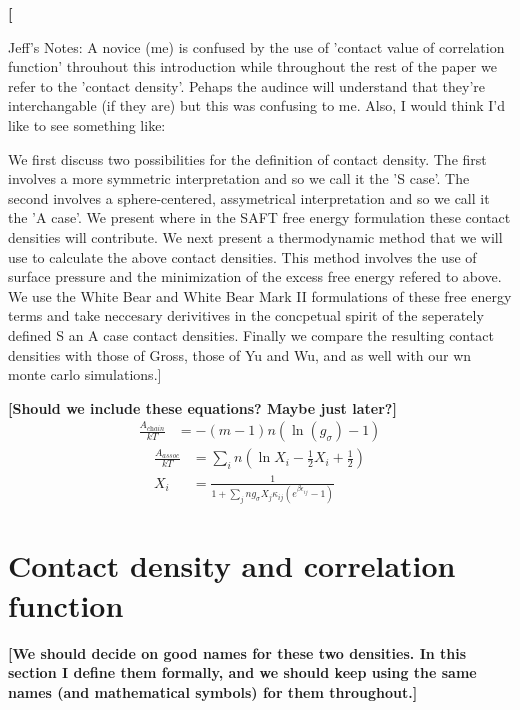 \documentclass[letterpaper,twocolumn,amsmath,amssymb,jcp,10pt,aip]{revtex4-1}
\newcommand{\red}[1]{{\bf \color{red} #1}}
\newcommand{\fixme}[1]{\red{[#1]}}
\begin{document}
\fixme{

Jeff's Notes:
A novice (me) is confused by the use of 'contact value of correlation function' throuhout this introduction while throughout the rest of the paper we refer to the 'contact density'.  Pehaps the audince will understand that they're interchangable (if they are) but this was confusing to me.  Also, I would think I'd like to see something like:

We first discuss two possibilities for the definition of contact density.  The first involves a more symmetric interpretation and so we call it the 'S case'.  The second involves a sphere-centered, assymetrical interpretation and so we call it the 'A case'.  We present where in the SAFT free energy formulation these contact densities will contribute.  We next present a thermodynamic method that we will use to calculate the above contact densities.  This method involves the use of surface pressure and the minimization of the excess free energy refered to above.  We use the White Bear and White Bear Mark II formulations of these free energy terms and take neccesary derivitives in the concpetual spirit of the seperately defined S an A case contact densities.  Finally we compare the resulting contact densities with those of Gross, those of Yu and Wu, and as well with our wn monte carlo simulations.}            

\fixme{Should we include these equations? Maybe just later?}
\begin{align}
  \frac{A_\textit{chain}}{kT} &= -(m-1) n \left(\ln\left(g_\sigma\right)-1\right)
\end{align}
\begin{align}
  \frac{A_\textit{assoc}}{kT} &= \sum_i n \left(\ln X_i - \frac12 X_i + \frac12\right) \\
  X_i &= \frac{1}{1 + \sum_j n g_\sigma X_j\kappa_{ij} \left(e^{\beta \epsilon_{ij}}-1\right)}
\end{align}

\section{Contact density and correlation function}

\fixme{We should decide on good names for these two densities.  In
  this section I define them formally, and we should keep using the
  same names (and mathematical symbols) for them throughout.}
\end{document}
